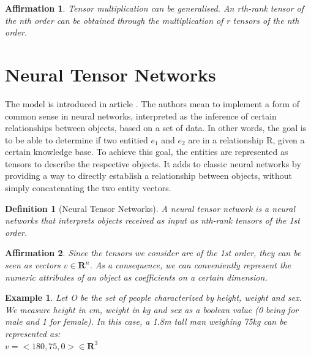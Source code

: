 \documentclass{article}
\newtheorem{definition}{Definition}[section]
\newtheorem{prop}{Affirmation}[section]
\newtheorem{example}{Example}[section]
\begin{document}
\begin{prop}
Tensor multiplication can be generalised. An rth-rank tensor of the nth order can be obtained through the multiplication of r tensors of the nth order.
\end{prop}

\section{Neural Tensor Networks}
The model is introduced in article \cite{NTN}. The authors mean to implement a form of common sense in neural networks, interpreted as the inference of certain relationships between objects, based on a set of data. In other words, the goal is to be able to determine if two entitied $e_1$ and $e_2$ are in a relationship R, given a certain knowledge base. To achieve this goal, the entities are represented as tensors to describe the respective objects. It adds to classic neural networks by providing a way to directly establish a relationship between objects, without simply concatenating the two entity vectors.

\begin{definition}[Neural Tensor Networks]
A neural tensor network is a neural networks that interprets objects received as input as nth-rank tensors of the 1st order.
\end{definition}

\begin{prop}
Since the tensors we consider are of the 1st order, they can be seen as vectors $v \in \mathbf{R}^n$. As a consequence, we can conveniently represent the numeric attributes of an object as coefficients on a certain dimension.
\end{prop}

\begin{example}
Let O be the set of people characterized by height, weight and sex. We measure height in cm, weight in kg and sex as a boolean value (0 being for male and 1 for female). In this case, a 1.8m tall man weighing 75kg can be represented as:\\
$v = <180, 75, 0> \in \mathbf{R}^3$
\end{example}

\end{document}
